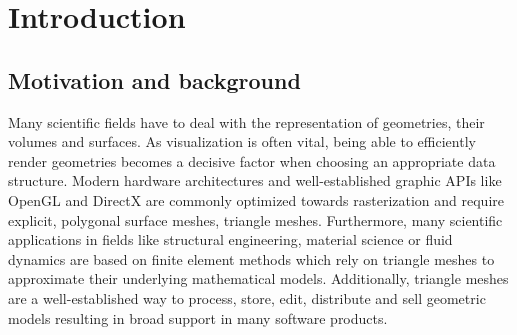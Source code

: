 \chapter{Introduction}
\label{ch:introduction}

\section{Motivation and background}
\label{sec:motivation}

Many scientific fields have to deal with the representation of geometries, their volumes and surfaces.
As visualization is often vital, being able to efficiently render geometries becomes a decisive factor when choosing an appropriate data structure.
Modern hardware architectures and well-established graphic APIs like OpenGL and DirectX are commonly optimized towards rasterization and require explicit, polygonal surface meshes, \eg triangle meshes.
Furthermore, many scientific applications in fields like structural engineering, material science or fluid dynamics are based on finite element methods which rely on triangle meshes to approximate their underlying mathematical models.
Additionally, triangle meshes are a well-established way to process, store, edit, distribute and sell geometric models resulting in broad support in many software products.


